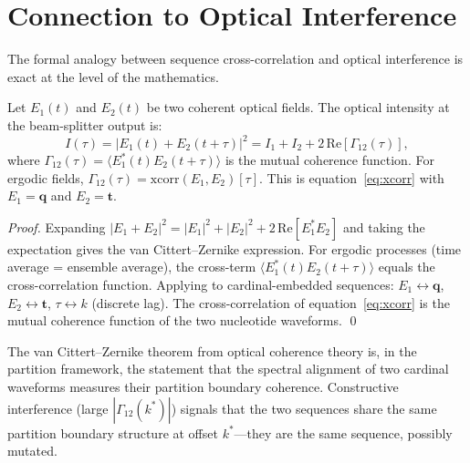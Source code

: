 \section{Connection to Optical Interference}
\label{sec:optical_connection}

The formal analogy between sequence cross-correlation and optical interference
is exact at the level of the mathematics.

\begin{proposition}
\label{prop:optical_identity}
Let $E_1(t)$ and $E_2(t)$ be two coherent optical fields. The optical intensity
at the beam-splitter output is:
\begin{equation}
  I(\tau) = |E_1(t) + E_2(t+\tau)|^2 = I_1 + I_2 + 2\,\mathrm{Re}[\Gamma_{12}(\tau)],
\end{equation}
where $\Gamma_{12}(\tau) = \langle E_1^*(t) E_2(t+\tau)\rangle$ is the
mutual coherence function. For ergodic fields, $\Gamma_{12}(\tau) = \mathrm{xcorr}(E_1,E_2)[\tau]$.
This is equation~\eqref{eq:xcorr} with $E_1 = \mathbf{q}$ and $E_2 = \mathbf{t}$.
\end{proposition}

\begin{proof}
Expanding $|E_1 + E_2|^2 = |E_1|^2 + |E_2|^2 + 2\,\mathrm{Re}[E_1^* E_2]$
and taking the expectation gives the van Cittert--Zernike expression. For
ergodic processes (time average = ensemble average), the cross-term
$\langle E_1^*(t) E_2(t+\tau)\rangle$ equals the cross-correlation function.
Applying to cardinal-embedded sequences: $E_1 \leftrightarrow \mathbf{q}$,
$E_2 \leftrightarrow \mathbf{t}$, $\tau \leftrightarrow k$ (discrete lag).
The cross-correlation of equation~\eqref{eq:xcorr} is the mutual coherence
function of the two nucleotide waveforms. \qed
\end{proof}

The van Cittert--Zernike theorem from optical coherence theory is, in the
partition framework, the statement that the spectral alignment of two cardinal
waveforms measures their partition boundary coherence. Constructive interference
(large $|\Gamma_{12}(k^*)|$) signals that the two sequences share the same
partition boundary structure at offset $k^*$---they are the same sequence,
possibly mutated.


